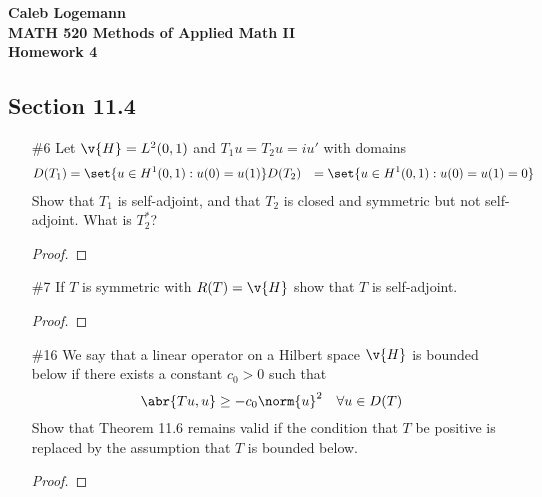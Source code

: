 \documentclass[11pt, oneside]{article}
\begin{document}
\noindent \textbf{\Large{Caleb Logemann \\
MATH 520 Methods of Applied Math II \\
Homework 4
}}

\subsection*{Section 11.4}
\begin{enumerate}
  \item[\#6]
    Let $\v{H} = L^2(0, 1)$ and $T_1u = T_2u = iu'$ with domains
    \begin{align*}
      D(T_1) &= \set{u \in H^1(0, 1): u(0) = u(1)}
      D(T_2) &= \set{u \in H^1(0, 1): u(0) = u(1) = 0}
    \end{align*}
    Show that $T_1$ is self-adjoint, and that $T_2$ is closed and symmetric but
    not self-adjoint.
    What is $T_2^*$?

    \begin{proof}
      
    \end{proof}

  \pagebreak
  \pagebreak
  \item[\#7]
    If $T$ is symmetric with $R(T) = \v{H}$ show that $T$ is self-adjoint.

    \begin{proof}
      
    \end{proof}

  \pagebreak
  \item[\#16]
    We say that a linear operator on a Hilbert space $\v{H}$ is bounded below
    if there exists a constant $c_0 > 0$ such that
    \[
      \abr{Tu, u} \ge -c_0 \norm{u}^2 \quad \forall u \in D(T)
    \]
    Show that Theorem 11.6 remains valid if the condition that $T$ be positive
    is replaced by the assumption that $T$ is bounded below.

    \begin{proof}
      
    \end{proof}
\end{enumerate}

\pagebreak
\end{document}
